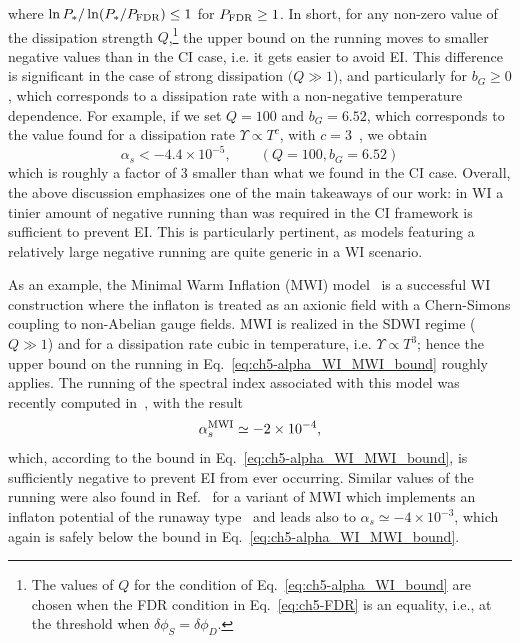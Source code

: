 where $\ln
P_*/\ln(P_*/P_{\rm{FDR}})\leq1$ for $P_{\rm{FDR}}\geq1$. In short, for any non-zero value of the dissipation strength $Q$,\footnote{The values of $Q$
for the condition of Eq.~\ref{eq:ch5-alpha_WI_bound} are chosen when the
FDR condition in Eq.~\ref{eq:ch5-FDR} is an equality, i.e., at the
threshold when $\delta\phi_S=\delta\phi_D$.} the upper bound on the running moves to smaller negative values   than in the CI case, i.e. it gets easier to avoid EI. This difference is significant in the case of strong dissipation $(Q\gg 1$), and particularly for $b_G\geq 0$, which corresponds to a dissipation rate with a non-negative temperature dependence. For example,
if we set $Q = 100$ and $b_G = 6.52$, which corresponds to the value found for a dissipation rate
$\Upsilon\propto T^c$, with $c=3$~\cite{Montefalcone:2022jfw}, we obtain
\begin{equation}
    \alpha_s< -4.4 \times 10^{-5}, \qquad \text{$(Q=100, b_G=6.52)$}\label{eq:ch5-alpha_WI_MWI_bound}
\end{equation}
which is roughly a factor of $3$ smaller than what we found in the CI
case.
Overall, the above discussion emphasizes one of the main takeaways of our work: in WI a tinier amount of negative running than was required in the CI framework
is sufficient to prevent EI. This is particularly pertinent, as models featuring a relatively large negative running are quite generic in a WI scenario.

As an example, the Minimal Warm Inflation (MWI) model~\cite{Berghaus:2019whh} is a successful WI construction where the
inflaton is treated as an axionic field with a Chern-Simons coupling
to non-Abelian gauge fields. MWI is realized in the SDWI regime ($Q\gg1$) and for a dissipation rate cubic in temperature, i.e. $\Upsilon\propto T^3$; hence the upper bound on the running in Eq.~\ref{eq:ch5-alpha_WI_MWI_bound} roughly applies. The running of the
spectral index associated with this model was recently computed in~\cite{Das:2022ubr}, with the result
\begin{equation}
\alpha_s^{\rm{MWI}}\simeq -2\times 10^{-4}, \label{eq:ch5-alpha_MWI_computed}
\end{equation}
which, according to the bound in Eq.~\ref{eq:ch5-alpha_WI_MWI_bound}, is
sufficiently negative to prevent EI from ever occurring. Similar
values of  the running were also found in Ref.~\cite{Das:2022ubr} for
a variant of MWI which implements an inflaton potential of the runaway
type~\cite{Das:2020xmh} and leads also to $\alpha_s\simeq
-4\times10^{-3}$, which again is safely below the bound in
Eq.~\ref{eq:ch5-alpha_WI_MWI_bound}.

